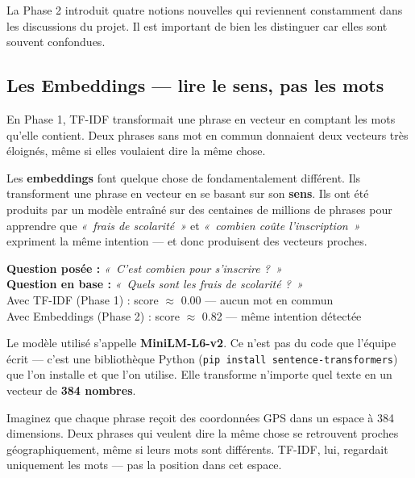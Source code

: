 \documentclass[11pt,a4paper]{article}
\begin{document}
La Phase 2 introduit quatre notions nouvelles qui reviennent
constamment dans les discussions du projet. Il est important
de bien les distinguer car elles sont souvent confondues.

\subsection{Les Embeddings --- lire le sens, pas les mots}

En Phase 1, TF-IDF transformait une phrase en vecteur en
comptant les mots qu'elle contient. Deux phrases sans mot
en commun donnaient deux vecteurs très éloignés, même si
elles voulaient dire la même chose.

Les \textbf{embeddings} font quelque chose de fondamentalement
différent. Ils transforment une phrase en vecteur en se basant
sur son \textbf{sens}. Ils ont été produits par un modèle entraîné
sur des centaines de millions de phrases pour apprendre que
\textit{«~frais de scolarité~»} et \textit{«~combien coûte
l'inscription~»} expriment la même intention --- et donc produisent
des vecteurs proches.

\begin{exemple}
\textbf{Question posée :} \textit{«~C'est combien pour s'inscrire ?~»} \\
\textbf{Question en base :} \textit{«~Quels sont les frais de scolarité ?~»} \\
\vspace{0.3cm}
Avec TF-IDF (Phase 1) : score $\approx$ 0.00 --- aucun mot en commun \\
Avec Embeddings (Phase 2) : score $\approx$ 0.82 --- même intention détectée
\end{exemple}

Le modèle utilisé s'appelle \textbf{MiniLM-L6-v2}. Ce n'est pas
du code que l'équipe écrit --- c'est une bibliothèque Python
(\texttt{pip install sentence-transformers}) que l'on installe
et que l'on utilise. Elle transforme n'importe quel texte en
un vecteur de \textbf{384 nombres}.

\begin{astuce}
Imaginez que chaque phrase reçoit des coordonnées GPS
dans un espace à 384 dimensions. Deux phrases qui veulent
dire la même chose se retrouvent proches géographiquement,
même si leurs mots sont différents. TF-IDF, lui, regardait
uniquement les mots --- pas la position dans cet espace.
\end{astuce}
\end{document}
